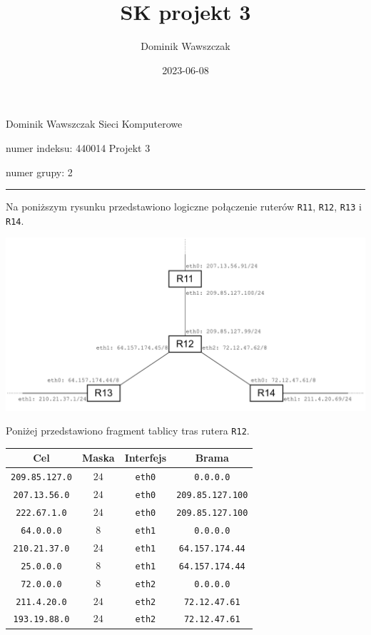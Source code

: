 \documentclass[12pt]{article}
\title{SK projekt 3}
\author{Dominik Wawszczak}
\date{2023-06-08}
\begin{document}
	\setlength{\parindent}{0 cm}
	
	Dominik Wawszczak \hfill Sieci Komputerowe
	
	numer indeksu: 440014 \hfill Projekt 3
	
	numer grupy: 2
	
	\bigskip
	\hrule
	\bigskip
	
	Na poniższym rysunku przedstawiono logiczne połączenie ruterów \texttt{R11},
	\texttt{R12}, \texttt{R13} i \texttt{R14}.
	\begin{center}
		\includegraphics[width = 0.95 \textwidth]{./routers-image.pdf}
	\end{center}
	
	\medskip
	
	Poniżej przedstawiono fragment tablicy tras rutera \texttt{R12}.
	\begin{center}
		\begin{tabular}{|c|c|c|c|}
			\hline
			Cel & Maska & Interfejs & Brama \\
			\hline
			\hline
			\texttt{209.85.127.0} & \(24\) & \texttt{eth0} & \texttt{0.0.0.0} \\
			\hline
			\texttt{207.13.56.0} & \(24\) & \texttt{eth0} & \texttt{209.85.127.100} \\
			\hline
			\texttt{222.67.1.0} & \(24\) & \texttt{eth0} & \texttt{209.85.127.100} \\
			\hline
			\texttt{64.0.0.0} & \(8\) & \texttt{eth1} & \texttt{0.0.0.0} \\
			\hline
			\texttt{210.21.37.0} & \(24\) & \texttt{eth1} & \texttt{64.157.174.44} \\
			\hline
			\texttt{25.0.0.0} & \(8\) & \texttt{eth1} & \texttt{64.157.174.44} \\
			\hline
			\texttt{72.0.0.0} & \(8\) & \texttt{eth2} & \texttt{0.0.0.0} \\
			\hline
			\texttt{211.4.20.0} & \(24\) & \texttt{eth2} & \texttt{72.12.47.61} \\
			\hline
			\texttt{193.19.88.0} & \(24\) & \texttt{eth2} & \texttt{72.12.47.61} \\
			\hline
		\end{tabular}
	\end{center}
	
\end{document}
